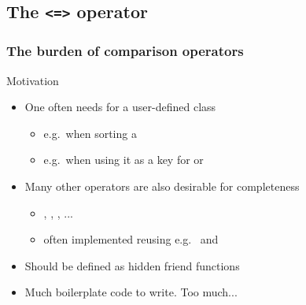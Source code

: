 \subsection[spaceship]{The \texttt{<=>} operator}

\begin{frame}[fragile]
  \frametitle{The burden of comparison operators}
  \begin{block}{Motivation}
    \begin{itemize}
    \item One often needs  for a user-defined class
      \begin{itemize}
      \item e.g.\ when sorting a 
      \item e.g.\ when using it as a key for  or 
      \end{itemize}
    \item Many other operators are also desirable for completeness
      \begin{itemize}
      \item {}, , , ...
      \item often implemented reusing e.g.\  and 
      \end{itemize}
    \item Should be defined as hidden friend functions
    \item Much boilerplate code to write. Too much...
    \end{itemize}
  \end{block}
\end{frame}

